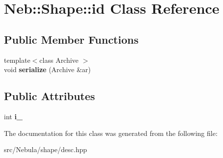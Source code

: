 \hypertarget{classNeb_1_1Shape_1_1id}{\section{\-Neb\-:\-:\-Shape\-:\-:id \-Class \-Reference}
\label{classNeb_1_1Shape_1_1id}
}
\subsection*{\-Public \-Member \-Functions}
\begin{DoxyCompactItemize}
\item 
\hypertarget{classNeb_1_1Shape_1_1id_a8dca096152f591a8a3b3acc50822892f}{{\footnotesize template$<$class Archive $>$ }\\void {\bfseries serialize} (\-Archive \&ar)}\label{classNeb_1_1Shape_1_1id_a8dca096152f591a8a3b3acc50822892f}

\end{DoxyCompactItemize}
\subsection*{\-Public \-Attributes}
\begin{DoxyCompactItemize}
\item 
\hypertarget{classNeb_1_1Shape_1_1id_aab8f2fc39c678ff321e0fe373bb7f905}{int {\bfseries i\-\_\-}}\label{classNeb_1_1Shape_1_1id_aab8f2fc39c678ff321e0fe373bb7f905}

\end{DoxyCompactItemize}


\-The documentation for this class was generated from the following file\-:\begin{DoxyCompactItemize}
\item 
src/\-Nebula/shape/desc.\-hpp\end{DoxyCompactItemize}
